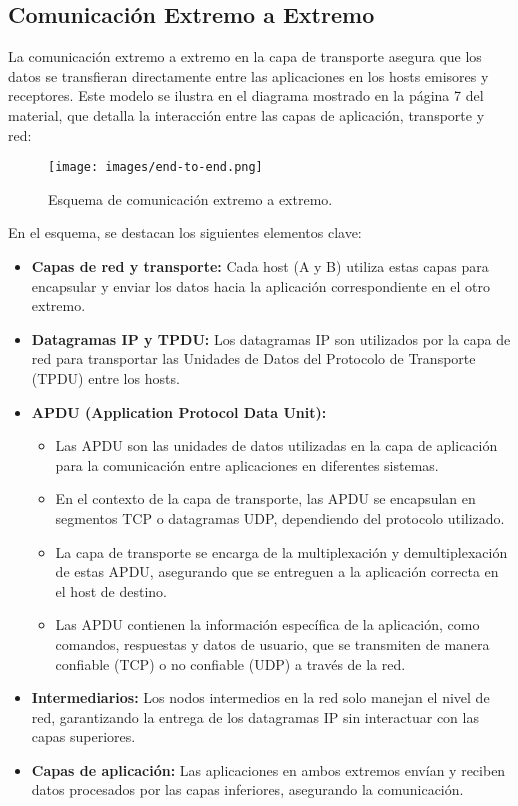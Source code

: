 \documentclass[a4paper,12pt]{article}
\begin{document}
\subsection{Comunicación Extremo a Extremo}

La comunicación extremo a extremo en la capa de transporte asegura que los datos se transfieran directamente entre las aplicaciones en los hosts emisores y receptores. Este modelo se ilustra en el diagrama mostrado en la página 7 del material, que detalla la interacción entre las capas de aplicación, transporte y red:

\begin{figure}[H]
    \centering
    \texttt{[image: images/end-to-end.png]}
    \caption{Esquema de comunicación extremo a extremo.}
    \label{fig:end_to_end}
\end{figure}

En el esquema, se destacan los siguientes elementos clave:
\begin{itemize}
    \item \textbf{Capas de red y transporte:} Cada host (A y B) utiliza estas capas para encapsular y enviar los datos hacia la aplicación correspondiente en el otro extremo.
    \item \textbf{Datagramas IP y TPDU:} Los datagramas IP son utilizados por la capa de red para transportar las Unidades de Datos del Protocolo de Transporte (TPDU) entre los hosts.
    \item \textbf{APDU (Application Protocol Data Unit):} 
        \begin{itemize}
            \item Las APDU son las unidades de datos utilizadas en la capa de aplicación para la comunicación entre aplicaciones en diferentes sistemas.
            \item En el contexto de la capa de transporte, las APDU se encapsulan en segmentos TCP o datagramas UDP, dependiendo del protocolo utilizado.
            \item La capa de transporte se encarga de la multiplexación y demultiplexación de estas APDU, asegurando que se entreguen a la aplicación correcta en el host de destino.
            \item Las APDU contienen la información específica de la aplicación, como comandos, respuestas y datos de usuario, que se transmiten de manera confiable (TCP) o no confiable (UDP) a través de la red.
        \end{itemize}
    \item \textbf{Intermediarios:} Los nodos intermedios en la red solo manejan el nivel de red, garantizando la entrega de los datagramas IP sin interactuar con las capas superiores.
    \item \textbf{Capas de aplicación:} Las aplicaciones en ambos extremos envían y reciben datos procesados por las capas inferiores, asegurando la comunicación.
\end{itemize}
\end{document}
